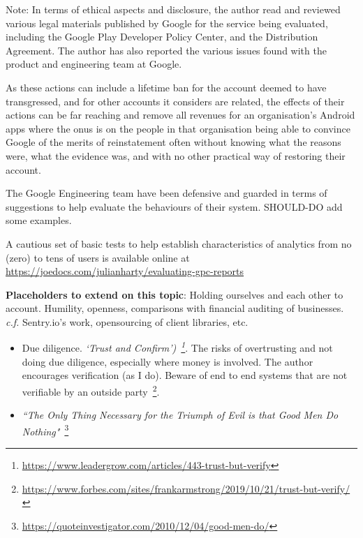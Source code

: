 Note: In terms of ethical aspects and disclosure, the author read and reviewed various legal materials published by Google for the service being evaluated, including the Google Play Developer Policy Center\citep{google_play_developer_policy_center}, and the Distribution Agreement\citep{google_play_developer_distribution_agreement}. The author has also reported the various issues found with the product and engineering team at Google.




As these actions can include a lifetime ban for the account deemed to have transgressed, and for other accounts it considers are related, the effects of their actions can be far reaching and remove all revenues for an organisation's Android apps where the onus is on the people in that organisation being able to convince Google of the merits of reinstatement often without knowing what the reasons were, what the evidence was, and with no other practical way of restoring their account.

The Google Engineering team have been defensive and guarded in terms of suggestions to help evaluate the behaviours of their system. SHOULD-DO add some examples. 

A cautious set of basic tests to help establish characteristics of analytics from no (zero) to tens of users is available online at 
\url{https://joedocs.com/julianharty/evaluating-gpc-reports}

\textbf{Placeholders to extend on this topic}: Holding ourselves and each other to account. Humility, openness, comparisons with financial auditing of businesses. \emph{c.f.} Sentry.io's work, opensourcing of client libraries, etc. 

\begin{itemize}
    \item Due diligence. \emph{`Trust and Confirm')~\footnote{\url{https://www.leadergrow.com/articles/443-trust-but-verify}}}. The risks of overtrusting and not doing due diligence, especially where money is involved. The author encourages verification (as I do). Beware of end to end systems that are not verifiable by an outside party~\footnote{\url{https://www.forbes.com/sites/frankarmstrong/2019/10/21/trust-but-verify/}}.
    \item \emph{``The Only Thing Necessary for the Triumph of Evil is that Good Men Do Nothing"}~\footnote{\url{https://quoteinvestigator.com/2010/12/04/good-men-do/}}
\end{itemize}

